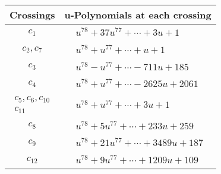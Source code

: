 \documentclass[1p]{elsarticle_modified}
\theoremstyle{definition}
\begin{document}
\begin{tabular}{m{50pt}|m{274pt}}
Crossings & \hspace{64pt}u-Polynomials at each crossing \\
\hline $$\begin{aligned}c_{1}\end{aligned}$$&$\begin{aligned}
&u^{78}+37 u^{77}+\cdots+3 u+1
\end{aligned}$\\
\hline $$\begin{aligned}c_{2},c_{7}\end{aligned}$$&$\begin{aligned}
&u^{78}+u^{77}+\cdots+u+1
\end{aligned}$\\
\hline $$\begin{aligned}c_{3}\end{aligned}$$&$\begin{aligned}
&u^{78}- u^{77}+\cdots-711 u+185
\end{aligned}$\\
\hline $$\begin{aligned}c_{4}\end{aligned}$$&$\begin{aligned}
&u^{78}+u^{77}+\cdots-2625 u+2061
\end{aligned}$\\
\hline $$\begin{aligned}c_{5},c_{6},c_{10}\\c_{11}\end{aligned}$$&$\begin{aligned}
&u^{78}+u^{77}+\cdots+3 u+1
\end{aligned}$\\
\hline $$\begin{aligned}c_{8}\end{aligned}$$&$\begin{aligned}
&u^{78}+5 u^{77}+\cdots+233 u+259
\end{aligned}$\\
\hline $$\begin{aligned}c_{9}\end{aligned}$$&$\begin{aligned}
&u^{78}+21 u^{77}+\cdots+3489 u+187
\end{aligned}$\\
\hline $$\begin{aligned}c_{12}\end{aligned}$$&$\begin{aligned}
&u^{78}+9 u^{77}+\cdots+1209 u+109
\end{aligned}$\\
\hline
\end{tabular}\newpage\renewcommand{\arraystretch}{1}
\end{document}
